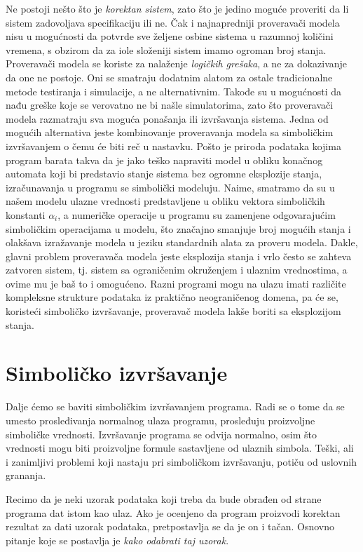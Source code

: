 \documentclass[a4paper]{article}
\begin{document}
Ne postoji nešto što je \textit{korektan sistem}, zato što je jedino moguće proveriti da li sistem zadovoljava specifikaciju ili ne. Čak i najnapredniji proveravači modela nisu u mogućnosti da potvrde sve željene osbine sistema u razumnoj količini vremena, s obzirom da za iole složeniji sistem imamo ogroman broj stanja. Proveravači modela se koriste za nalaženje \textit{logičkih grešaka}, a ne za dokazivanje da one ne postoje. \cite{boundedMC} Oni se smatraju dodatnim alatom za ostale tradicionalne metode testiranja i simulacije, a ne alternativnim. Takođe su u mogućnosti da nađu greške koje se verovatno ne bi našle simulatorima, zato što proveravači modela razmatraju sva moguća ponašanja ili izvršavanja sistema.
Jedna od mogućih alternativa jeste kombinovanje proveravanja modela sa simboličkim izvršavanjem o čemu će biti reč u nastavku. Pošto je priroda podataka kojima program barata takva da je jako teško napraviti model u obliku konačnog automata koji bi predstavio stanje sistema bez ogromne eksplozije stanja, izračunavanja u programu se simbolički modeluju. Naime, smatramo da su u našem modelu ulazne vrednosti predstavljene u obliku vektora simboličkih konstanti $\alpha_i$, a numeričke operacije u programu su zamenjene odgovarajućim simboličkim operacijama u modelu, što značajno smanjuje broj mogućih stanja i olakšava izražavanje modela u jeziku standardnih alata za proveru modela. Dakle, glavni problem proveravača modela jeste eksplozija stanja i vrlo često se zahteva zatvoren sistem, tj. sistem sa ograničenim okruženjem i ulaznim vrednostima, a ovime mu je baš to i omogućeno. Razni programi mogu na ulazu imati različite kompleksne strukture podataka iz praktično neograničenog domena, pa će se, koristeći simboličko izvršavanje, proveravač modela lakše boriti sa eksplozijom stanja. 
 


\section{Simboličko izvršavanje}
\label{sec:naslov2}
Dalje ćemo se baviti simboličkim izvršavanjem programa. Radi se o tome da se umesto prosleđivanja normalnog ulaza programu, prosleđuju proizvoljne simboličke vrednosti. Izvršavanje programa se odvija normalno, osim što vrednosti mogu biti proizvoljne formule sastavljene od ulaznih simbola. Teški, ali i zanimljivi problemi koji nastaju pri simboličkom izvršavanju, potiču od uslovnih grananja. 

Recimo da je neki uzorak podataka koji treba da bude obrađen od strane programa dat istom kao ulaz. Ako je ocenjeno da program proizvodi korektan rezultat za dati uzorak podataka, pretpostavlja se da je on i tačan. Osnovno pitanje koje se postavlja je \textit{kako odabrati taj uzorak}.
\end{document}
